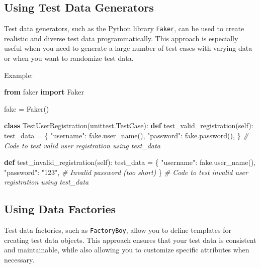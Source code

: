 \documentclass[
  paper=a4,
  ,captions=tableheading
]{scrartcl}
\newenvironment{Shaded}{}{}
\newcommand{\CommentTok}[1]{\textcolor[rgb]{0.38,0.63,0.69}{\textit{#1}}}
\newcommand{\ImportTok}[1]{\textcolor[rgb]{0.00,0.50,0.00}{\textbf{#1}}}
\newcommand{\KeywordTok}[1]{\textcolor[rgb]{0.00,0.44,0.13}{\textbf{#1}}}
\newcommand{\NormalTok}[1]{#1}
\newcommand{\OperatorTok}[1]{\textcolor[rgb]{0.40,0.40,0.40}{#1}}
\newcommand{\StringTok}[1]{\textcolor[rgb]{0.25,0.44,0.63}{#1}}
\newcommand{\VariableTok}[1]{\textcolor[rgb]{0.10,0.09,0.49}{#1}}
\begin{document}
\hypertarget{using-test-data-generators}{%
\subsection{Using Test Data
Generators}\label{using-test-data-generators}}

Test data generators, such as the Python library \texttt{Faker}, can be
used to create realistic and diverse test data programmatically. This
approach is especially useful when you need to generate a large number
of test cases with varying data or when you want to randomize test data.

Example:

\begin{Shaded}
\begin{Highlighting}[]

\ImportTok{from}\NormalTok{ faker }\ImportTok{import}\NormalTok{ Faker}

\NormalTok{fake }\OperatorTok{=}\NormalTok{ Faker()}

\KeywordTok{class}\NormalTok{ TestUserRegistration(unittest.TestCase):}
    \KeywordTok{def}\NormalTok{ test\_valid\_registration(}\VariableTok{self}\NormalTok{):}
\NormalTok{        test\_data }\OperatorTok{=}\NormalTok{ \{}
            \StringTok{"username"}\NormalTok{: fake.user\_name(),}
            \StringTok{"password"}\NormalTok{: fake.password(),}
\NormalTok{        \}}
        \CommentTok{\# Code to test valid user registration using test\_data}

    \KeywordTok{def}\NormalTok{ test\_invalid\_registration(}\VariableTok{self}\NormalTok{):}
\NormalTok{        test\_data }\OperatorTok{=}\NormalTok{ \{}
            \StringTok{"username"}\NormalTok{: fake.user\_name(),}
            \StringTok{"password"}\NormalTok{: }\StringTok{"123"}\NormalTok{,  }\CommentTok{\# Invalid password (too short)}
\NormalTok{        \}}
        \CommentTok{\# Code to test invalid user registration using test\_data}
\end{Highlighting}
\end{Shaded}

\hypertarget{using-data-factories}{%
\subsection{Using Data Factories}\label{using-data-factories}}

Test data factories, such as \texttt{FactoryBoy}, allow you to define
templates for creating test data objects. This approach ensures that
your test data is consistent and maintainable, while also allowing you
to customize specific attributes when necessary.
\end{document}
